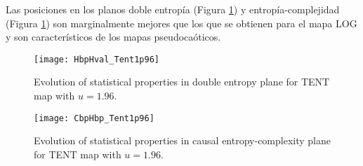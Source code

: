 Las posiciones en los planos doble entropía (Figura \ref{fig:TENT1p96_HH}) y entropía-complejidad (Figura \ref{fig:TENT1p96_HH}) son marginalmente mejores que los que se obtienen para el mapa LOG y son característicos de los mapas pseudocaóticos.
%
\begin{figure}[htpb]
	\centering
	\texttt{[image: HbpHval\_Tent1p96]}
	\caption{Evolution of statistical properties in double entropy plane for TENT map with $u=1.96$.}
	\label{fig:TENT1p96_HH}
\end{figure}
%
\begin{figure}[htpb]
	\centering
	\texttt{[image: CbpHbp\_Tent1p96]}
	\caption{$H_{BP} \times C_{BP}$}
	\caption{Evolution of statistical properties in causal entropy-complexity plane for TENT map with $u=1.96$.}
	\label{fig:TENT1p96_HbpCbp}
\end{figure}